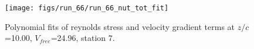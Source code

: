 \begin{figure}[H]
\centering
\texttt{[image: figs/run\_66/run\_66\_nut\_tot\_fit]}
\caption{Polynomial fits of reynolds stress and velocity gradient terms at $z/c$=10.00, $V_{free}$=24.96, station 7.}
\label{fig:run_66_nut_tot_fit}
\end{figure}


